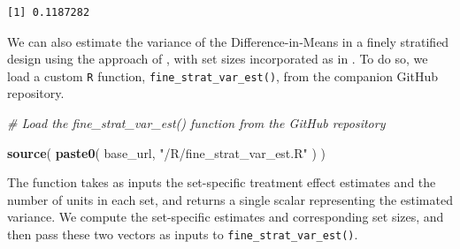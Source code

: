 \documentclass[
  12pt,
  leqno]{article}
\newenvironment{Shaded}{\begin{snugshade}}{\end{snugshade}}
\newcommand{\CommentTok}[1]{\textcolor[rgb]{0.56,0.35,0.01}{\textit{#1}}}
\newcommand{\FunctionTok}[1]{\textcolor[rgb]{0.13,0.29,0.53}{\textbf{#1}}}
\newcommand{\NormalTok}[1]{#1}
\newcommand{\StringTok}[1]{\textcolor[rgb]{0.31,0.60,0.02}{#1}}
\begin{document}
\begin{verbatim}
[1] 0.1187282
\end{verbatim}

\doublespacing

We can also estimate the variance of the Difference-in-Means in a finely
stratified design using the approach of \citet{fogarty2018}, with set
sizes incorporated as in \citet[p.~2199]{fogarty2023}. To do so, we load
a custom \texttt{R} function, \mbox{\texttt{fine\_strat\_var\_est()}},
from the companion GitHub repository.

\singlespacing

\begin{Shaded}
\begin{Highlighting}[]
\CommentTok{\# Load the fine\_strat\_var\_est() function from the GitHub repository}

\FunctionTok{source}\NormalTok{(}
  \FunctionTok{paste0}\NormalTok{(}
\NormalTok{    base\_url, }\StringTok{"/R/fine\_strat\_var\_est.R"}
\NormalTok{  )}
\NormalTok{)}
\end{Highlighting}
\end{Shaded}

\doublespacing

The function takes as inputs the set-specific treatment effect estimates
and the number of units in each set, and returns a single scalar
representing the estimated variance. We compute the set-specific
estimates and corresponding set sizes, and then pass these two vectors
as inputs to \texttt{fine\_strat\_var\_est()}.

\singlespacing
\end{document}
